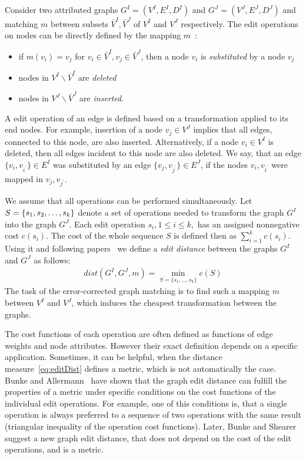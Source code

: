 Consider two attributed graphs $G^I = (V^I, E^I,D^I)$ and $G^J = (V^J, E^J,D^J)$ and matching $m$ between subsets $\bar{V}^I,\bar{V}^J$ of $V^I$ and $V^J$ respectively. The edit operations on nodes can be directly defined by the mapping $m$~\cite{Bunke1998_ErrTolerantGM}:
\begin{itemize}
	\item if $m(v_i)=v_j$ for $v_i\in\bar{V}^I,v_j\in\bar{V}^J$, then a node $v_i$ is \emph{substituted} by a node $v_j$
	\item nodes in $V^I\backslash\bar{V}^I$ are \emph{deleted}
	\item nodes in $V^J\backslash\bar{V}^J$ are \emph{inserted}.
\end{itemize}
A edit operation of an edge is defined based on a transformation applied to its end nodes. For example, insertion of a node $v_j\in V^J$ implies that all edges, connected to this node, are also inserted. Alternatively, if a node $v_i\in V^I$ is deleted, then all edges incident to this node are also deleted. We say, that an edge $\{v_i,v_{i^\prime}\}\in E^I$ was substituted by an edge $\{v_j,v_{j^\prime}\}\in E^J$, if the nodes $v_i,v_{i^\prime}$ were mapped in $v_j,v_{j^\prime}$.

We assume that all operations can be performed simultaneously. Let $S=\{s_1,s_2,\dots,\newline s_k\}$ denote a set of operations needed to transform the graph $G^I$ into the graph $G^J$. 
Each edit operation $s_i, 1\le i\le k,$ has an assigned nonnegative cost $c(s_i)$. The cost of the whole sequence $S$ is defined then as $\sum_{i=1}^{k}c(s_i)$. Using it and following papers~\cite{Bunke1983_inexactGM, Wang1995} we define a \emph{edit distance} between the graphs $G^I$ and $G^J$ as follows:
\begin{eqnarray} \label{eq:editDist}
dist(G^I,G^J,m) = \min\limits_{S=\{s_1,\dots,s_k\}}c(S)
\end{eqnarray}
The task of the error-corrected graph matching is to find such a mapping $m$ between $V^I$ and $V^J$, which induces the cheapest transformation between the graphs.

The cost functions of each operation are often defined as functions of edge weights and node attributes. However their exact definition depends on a specific application. Sometimes, it can be helpful, when the distance measure~\eqref{eq:editDist} defines a metric, which is not automatically the case. Bunke and Allermann~\cite{Bunke1983_inexactGM} have shown that the graph edit distance can fulfill the properties of a metric under specific conditions on the cost functions of the individual edit operations. For example, one of this conditions is, that a single operation is always preferred to a sequence of two operations with the same result (triangular inequality of the operation cost functions). Later, Bunke and Shearer~\cite{Bunke1998_graphDist} suggest a new graph edit distance, that does not depend on the cost of the edit operations, and is a metric.

